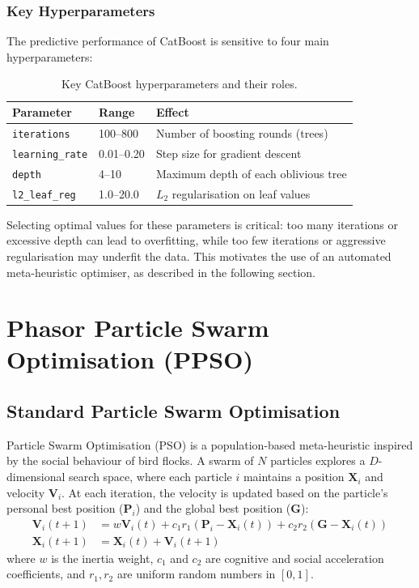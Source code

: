 \subsubsection{Key Hyperparameters}

The predictive performance of CatBoost is sensitive to four main hyperparameters:

\begin{table}[H]
\centering
\caption{Key CatBoost hyperparameters and their roles.}
\label{tab:catboost_hyperparams}
\begin{tabular}{@{}lll@{}}
\toprule
\textbf{Parameter} & \textbf{Range} & \textbf{Effect} \\
\midrule
\texttt{iterations} & 100--800 & Number of boosting rounds (trees) \\
\texttt{learning\_rate} & 0.01--0.20 & Step size for gradient descent \\
\texttt{depth} & 4--10 & Maximum depth of each oblivious tree \\
\texttt{l2\_leaf\_reg} & 1.0--20.0 & $L_2$ regularisation on leaf values \\
\bottomrule
\end{tabular}
\end{table}

Selecting optimal values for these parameters is critical: too many iterations or excessive depth can lead to overfitting, while too few iterations or aggressive regularisation may underfit the data. This motivates the use of an automated meta-heuristic optimiser, as described in the following section.


\section{Phasor Particle Swarm Optimisation (PPSO)}\label{sec:ppso}

\subsection{Standard Particle Swarm Optimisation}

Particle Swarm Optimisation (PSO) \parencite{kennedy1995pso} is a population-based meta-heuristic inspired by the social behaviour of bird flocks. A swarm of $N$ particles explores a $D$-dimensional search space, where each particle $i$ maintains a position $\mathbf{X}_i$ and velocity $\mathbf{V}_i$. At each iteration, the velocity is updated based on the particle's personal best position ($\mathbf{P}_i$) and the global best position ($\mathbf{G}$):
\begin{align}
    \mathbf{V}_i(t+1) &= w \mathbf{V}_i(t) + c_1 r_1 (\mathbf{P}_i - \mathbf{X}_i(t)) + c_2 r_2 (\mathbf{G} - \mathbf{X}_i(t)) \label{eq:pso_vel} \\
    \mathbf{X}_i(t+1) &= \mathbf{X}_i(t) + \mathbf{V}_i(t+1) \label{eq:pso_pos}
\end{align}
where $w$ is the inertia weight, $c_1$ and $c_2$ are cognitive and social acceleration coefficients, and $r_1, r_2$ are uniform random numbers in $[0,1]$.

